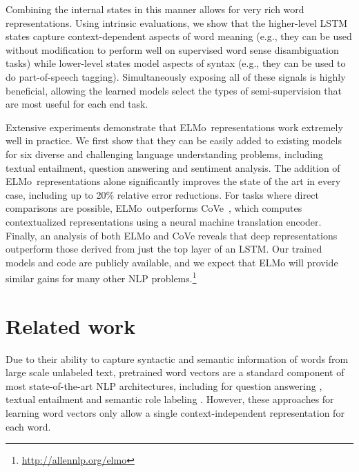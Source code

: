 \documentclass[11pt,a4paper]{article}
\newcommand{\ELMO}{ELMo}
\begin{document}
Combining the internal states in this manner allows for very rich word representations.  Using intrinsic evaluations, we show that the higher-level LSTM states capture context-dependent aspects of word meaning (e.g., they can be used without modification to perform well on supervised word sense disambiguation tasks) while lower-level states model aspects of syntax (e.g., they can be used to do part-of-speech tagging). Simultaneously exposing all of these signals is highly beneficial, allowing the learned models select the types of semi-supervision that are most useful for each end task. 

Extensive experiments demonstrate that \ELMO\ representations work extremely well in practice.
We first show that they can be easily added to existing models for six diverse and challenging language understanding problems, including textual entailment, question answering and sentiment analysis.
The addition of \ELMO\ representations alone significantly improves the state of the art in every case, including up to 20\% relative error reductions.
For tasks where direct comparisons are possible, \ELMO\ outperforms CoVe~\citep{McCann2017LearnedIT}, which computes contextualized representations using a neural machine translation encoder.
Finally, an analysis of both \ELMO{} and CoVe reveals that deep representations outperform those derived from just the top layer of an LSTM.
Our trained models and code are publicly available, and we expect that ELMo will provide similar gains for many other NLP problems.\footnote{\url{http://allennlp.org/elmo}}


















\section{Related work}



Due to their ability to capture syntactic and semantic information of words from large scale unlabeled text, pretrained word vectors \citep{Turian2010WordRA,word2vec,Pennington2014GloveGV} are a standard component of most state-of-the-art NLP architectures, including for question answering \citep{liu2017stochastic}, textual entailment \citep{Chen2017EnhancedLF} and semantic role labeling \citep{He2017DeepSR}.
However, these approaches for learning word vectors only allow a single context-independent representation for each word.
\end{document}
